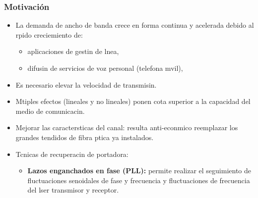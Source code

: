 \documentclass[xcolor=dvipsnames,mathserif,9pt]{beamer}
\begin{document}
  \begin{frame}[allowframebreaks] 
	\frametitle{Motivación}
    \begin{itemize}\itemsep=0.25cm
    \item La  demanda  de   ancho  de  banda  crece  en   forma  continua  y
      acelerada debido al rpido creciemiento de:
      \begin{itemize}\itemsep=0.2cm
      \item aplicaciones de gestin de lnea,\\
      \item difusin de servicios de voz personal (telefona mvil),\\
      \end{itemize}
     
    \item Es necesario elevar la  velocidad  de  transmisin.\\
    \item Mtiples efectos (lineales  y no lineales) ponen cota
      superior a la capacidad del medio de comunicacin.\\
   
  
    \item Mejorar las  caractersticas del canal: resulta anti-econmico
      reemplazar los grandes tendidos de fibra ptica ya instalados.\\
      
    \item Tcnicas  de recuperacin de  portadora:
      \begin{itemize}\itemsep=0.2cm
      \item \textbf{Lazos  enganchados en fase  (PLL):} permite realizar
        el seguimiento de fluctuaciones  senoidales de fase y frecuencia
        y fluctuaciones de frecuencia del lser transmisor y receptor.
        
     \end{itemize}
    \end{itemize}
  
  \end{frame}
  
\end{document}

